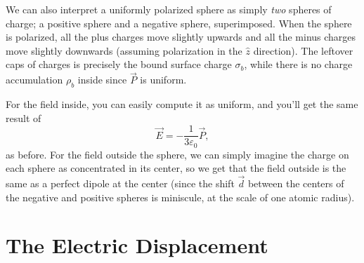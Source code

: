 \begin{remark}
We can also interpret a uniformly polarized sphere as simply \textit{two} spheres of charge; a positive sphere and a negative sphere, superimposed. When the sphere is polarized, all the plus charges move slightly upwards and all the minus charges move slightly downwards (assuming polarization in the $\hat{z}$ direction). The leftover caps of charges is precisely the bound surface charge $\sigma_b$, while there is no charge accumulation $\rho_b$ inside since $\vec{P}$ is uniform.

For the field inside, you can easily compute it as uniform, and you'll get the same result of 
\[\vec{E}=-\frac{1}{3\varepsilon_0}\vec{P},\]
as before. For the field outside the sphere, we can simply imagine the charge on each sphere as concentrated in its center, so we get that the field outside is the same as a perfect dipole at the center (since the shift $\vec{d}$ between the centers of the negative and positive spheres is miniscule, at the scale of one atomic radius).
\end{remark}






\section{The Electric Displacement}


